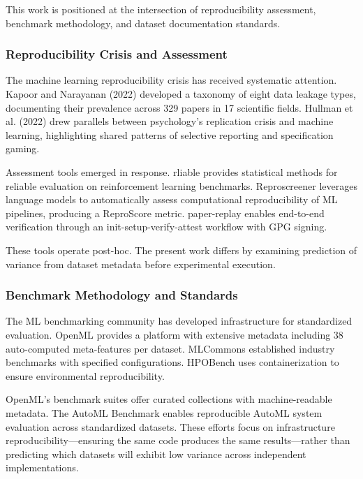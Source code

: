 
This work is positioned at the intersection of reproducibility assessment, benchmark methodology, and dataset documentation standards.

\subsubsection{Reproducibility Crisis and Assessment}

The machine learning reproducibility crisis has received systematic attention. Kapoor and Narayanan (2022) developed a taxonomy of eight data leakage types, documenting their prevalence across 329 papers in 17 scientific fields. Hullman et al. (2022) drew parallels between psychology's replication crisis and machine learning, highlighting shared patterns of selective reporting and specification gaming.

Assessment tools emerged in response. rliable \citep{agarwal2021deep} provides statistical methods for reliable evaluation on reinforcement learning benchmarks. Reproscreener \citep{bhaskar2024reproscreener} leverages language models to automatically assess computational reproducibility of ML pipelines, producing a ReproScore metric. paper-replay enables end-to-end verification through an init-setup-verify-attest workflow with GPG signing.

These tools operate post-hoc. The present work differs by examining prediction of variance from dataset metadata before experimental execution.

\subsubsection{Benchmark Methodology and Standards}

The ML benchmarking community has developed infrastructure for standardized evaluation. OpenML \citep{vanschoren2014openml} provides a platform with extensive metadata including 38 auto-computed meta-features per dataset. MLCommons established industry benchmarks with specified configurations. HPOBench \citep{eggensperger2021hpobench} uses containerization to ensure environmental reproducibility.

OpenML's benchmark suites offer curated collections with machine-readable metadata. The AutoML Benchmark \citep{gijsbers2019automl} enables reproducible AutoML system evaluation across standardized datasets. These efforts focus on infrastructure reproducibility---ensuring the same code produces the same results---rather than predicting which datasets will exhibit low variance across independent implementations.

